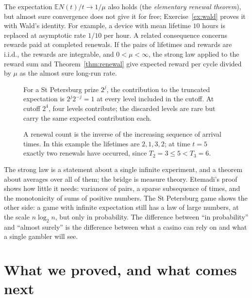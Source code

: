 The expectation $\mathbb E N(t)/t\to1/\mu$ also holds (the \emph{elementary renewal theorem}), but almost sure convergence does not give it for free;
Exercise~\ref{ex:wald} proves it with Wald's identity. For example, a device with mean lifetime $10$ hours is replaced at asymptotic rate $1/10$ per hour. A related consequence concerns rewards paid at completed renewals. If the pairs of lifetimes and rewards are i.i.d., the rewards are integrable, and $0<\mu<\infty$, the strong law applied to the reward sum and Theorem~\ref{thm:renewal} give expected reward per cycle divided by $\mu$ as the almost sure long-run rate.


\begin{figure}[ht]
\centering{}
\caption{For a St Petersburg prize $2^j$, the contribution to the truncated expectation is $2^j2^{-j}=1$ at every level included in the cutoff. At cutoff $2^4$, four levels contribute; the discarded levels are rare but carry the same expected contribution each.}
\label{fig:v11-ch02-truncation}
\end{figure}

\begin{figure}[ht]
\centering{}
\caption{A renewal count is the inverse of the increasing sequence of arrival times. In this example the lifetimes are $2,1,3,2$; at time $t=5$ exactly two renewals have occurred, since $T_2=3\le5<T_3=6$.}
\label{fig:v11-ch02-renewal}
\end{figure}

\begin{beauty}
The strong law is a statement about a single infinite experiment, and a theorem about averages over all of them; the bridge is measure theory.
Etemadi's proof shows how little it needs: variances of pairs, a sparse subsequence of times, and the monotonicity of sums of positive numbers. The
St Petersburg game shows the other side: a game with infinite expectation still has a law of large numbers, at the scale $n\log_2 n$, but only in
probability. The difference between ``in probability'' and ``almost surely'' is the difference between what a casino can rely on and what a single
gambler will see.
\end{beauty}

\section{What we proved, and what comes next}

